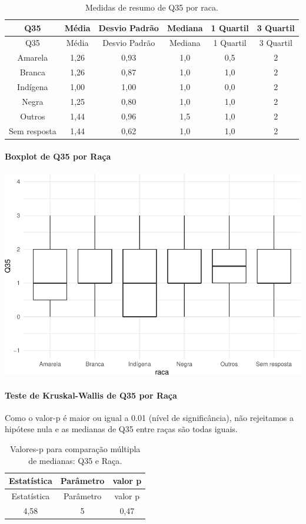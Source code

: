 \documentclass[]{article}
\let\oldparagraph\paragraph
\renewcommand{\paragraph}[1]{\oldparagraph{#1}\mbox{}}
\begin{document}
\begin{longtable}[]{@{}cccccc@{}}
\caption{\label{tab:unnamed-chunk-1286}Medidas de resumo de Q35 por raca.}\tabularnewline
\toprule
Q35 & Média & Desvio Padrão & Mediana & 1 Quartil & 3 Quartil\tabularnewline
\midrule
\endfirsthead
\toprule
Q35 & Média & Desvio Padrão & Mediana & 1 Quartil & 3 Quartil\tabularnewline
\midrule
\endhead
Amarela & 1,26 & 0,93 & 1,0 & 0,5 & 2\tabularnewline
Branca & 1,26 & 0,87 & 1,0 & 1,0 & 2\tabularnewline
Indígena & 1,00 & 1,00 & 1,0 & 0,0 & 2\tabularnewline
Negra & 1,25 & 0,80 & 1,0 & 1,0 & 2\tabularnewline
Outros & 1,44 & 0,96 & 1,5 & 1,0 & 2\tabularnewline
Sem resposta & 1,44 & 0,62 & 1,0 & 1,0 & 2\tabularnewline
\bottomrule
\end{longtable}

\hypertarget{boxplot-de-q35-por-rauxe7a}{%
\paragraph{Boxplot de Q35 por Raça}\label{boxplot-de-q35-por-rauxe7a}}

\begin{center}\includegraphics[width=0.75\linewidth]{relatorio_covid19_files/figure-latex/unnamed-chunk-1287-1} \end{center}

\hypertarget{teste-de-kruskal-wallis-de-q35-por-rauxe7a}{%
\paragraph{Teste de Kruskal-Wallis de Q35 por Raça}\label{teste-de-kruskal-wallis-de-q35-por-rauxe7a}}

Como o valor-p é maior ou igual a 0.01 (nível de significância), não rejeitamos a hipótese nula e as medianas de Q35 entre raças são todas iguais.

\begin{longtable}[]{@{}ccc@{}}
\caption{\label{tab:unnamed-chunk-1289}Valores-p para comparação múltipla de medianas: Q35 e Raça.}\tabularnewline
\toprule
Estatística & Parâmetro & valor p\tabularnewline
\midrule
\endfirsthead
\toprule
Estatística & Parâmetro & valor p\tabularnewline
\midrule
\endhead
4,58 & 5 & 0,47\tabularnewline
\bottomrule
\end{longtable}
\end{document}
